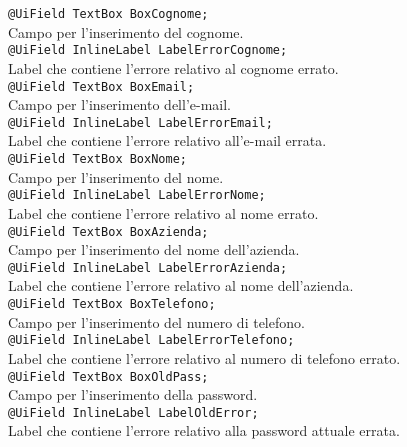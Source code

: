 {\begin{sloppypar}
{\begin{itemize}
\begin{itemize}
				\texttt{@UiField TextBox BoxCognome;}\\
				Campo per l'inserimento del cognome.\\

				\texttt{@UiField InlineLabel LabelErrorCognome;}\\
				Label che contiene l’errore relativo al cognome errato.\\
				
				\texttt{@UiField TextBox BoxEmail;}\\
				Campo per l'inserimento dell'e-mail.\\

				\texttt{@UiField InlineLabel LabelErrorEmail;}\\
				Label che contiene l’errore relativo all'e-mail errata.\\
				
				\texttt{@UiField TextBox BoxNome;}\\
				Campo per l'inserimento del nome.\\

				\texttt{@UiField InlineLabel LabelErrorNome;}\\
				Label che contiene l’errore relativo al nome errato.\\
				
				\texttt{@UiField TextBox BoxAzienda;}\\
				Campo per l'inserimento del nome dell'azienda.\\

				\texttt{@UiField InlineLabel LabelErrorAzienda;}\\
				Label che contiene l’errore relativo al nome dell'azienda.\\
				
				\texttt{@UiField TextBox BoxTelefono;}\\
				Campo per l'inserimento del numero di telefono.\\

				\texttt{@UiField InlineLabel LabelErrorTelefono;}\\
				Label che contiene l’errore relativo al numero di telefono errato.\\

				\texttt{@UiField TextBox BoxOldPass;}\\
				Campo per l'inserimento della password.\\

				\texttt{@UiField InlineLabel LabelOldError;}\\
				Label che contiene l’errore relativo alla password attuale errata.\\


\end{itemize}
\end{itemize}}
\end{sloppypar}}
